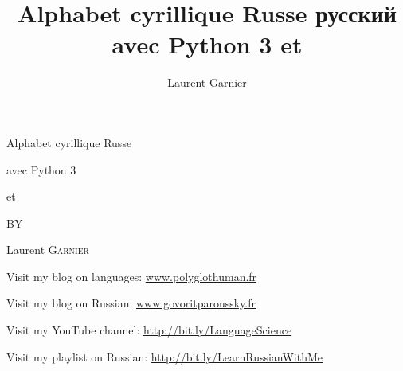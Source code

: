 \documentclass[12pt,a4paper]{article}
\author{Laurent Garnier}
\date{}
\title{Alphabet cyrillique Russe \textrussian{русский}\\ avec Python 3 et \XeLaTeX}
\begin{document}
\begin{titlepage}

\begin{center}

{\Large {\sc Alphabet cyrillique Russe\par avec Python 3\par et \XeLaTeX} \par}
\vspace{2cm}
\end{center}
\newpage

\vspace{2cm}

\begin{center}

BY

{\Large Laurent \textsc{Garnier} \par}

\vspace{2cm}
{\sc Visit my blog on languages:}
 \url{www.polyglothuman.fr}\par
{\sc Visit my blog on Russian:}
 \url{www.govoritparoussky.fr}\par

\end{center}
\newpage

\begin{center}

 {\sc Visit my YouTube channel:} 
 \url{http://bit.ly/LanguageScience}\par

 {\sc Visit my playlist on Russian:} 
 \url{http://bit.ly/LearnRussianWithMe}\par

\end{center}

\end{titlepage}

\tableofcontents
\end{document}
